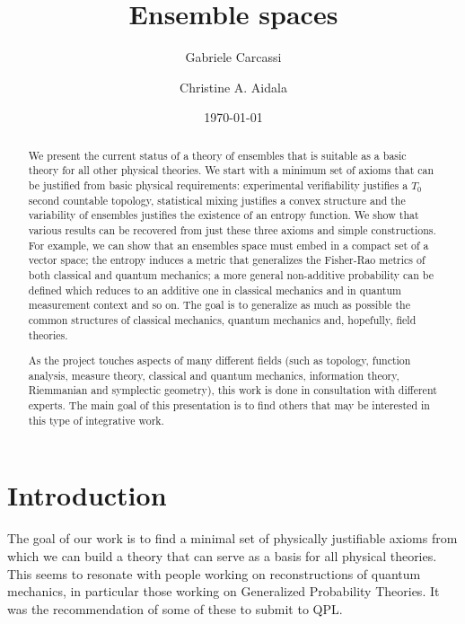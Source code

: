 \documentclass[10pt,twocolumn, nofootinbib]{revtex4-2}
\begin{document}
\title{Ensemble spaces}
\author{Gabriele Carcassi}
\author{Christine A. Aidala}

\date{\today}


\begin{abstract}
	We present the current status of a theory of ensembles that is suitable as a basic theory for all other physical theories. We start with a minimum set of axioms that can be justified from basic physical requirements: experimental verifiability justifies a $T_0$ second countable topology, statistical mixing justifies a convex structure and the variability of ensembles justifies the existence of an entropy function. We show that various results can be recovered from just these three axioms and simple constructions. For example, we can show that an ensembles space must embed in a compact set of a vector space; the entropy induces a metric that generalizes the Fisher-Rao metrics of both classical and quantum mechanics; a more general non-additive probability can be defined which reduces to an additive one in classical mechanics and in quantum measurement context and so on. The goal is to generalize as much as possible the common structures of classical mechanics, quantum mechanics and, hopefully, field theories.

	As the project touches aspects of many different fields (such as topology, function analysis, measure theory, classical and quantum mechanics, information theory, Riemmanian and symplectic geometry), this work is done in consultation with different experts. The main goal of this presentation is to find others that may be interested in this type of integrative work. 
\end{abstract}

\maketitle


\section{Introduction}

The goal of our work is to find a minimal set of physically justifiable axioms from which we can build a theory that can serve as a basis for all physical theories. This seems to resonate with people working on reconstructions of quantum mechanics, in particular those working on Generalized Probability Theories. It was the recommendation of some of these to submit to QPL.
\end{document}
